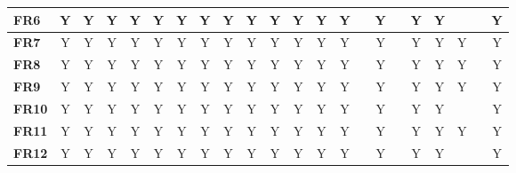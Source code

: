 \documentclass{article}
\begin{document}
\begin{table}[H]
\begin{adjustwidth}{-1.65in}{-1in}
{\begin{tabular}{c|c|c|c|c|c|c|c|c|c|c|c|c|c|c|c|c|c|c|c|c|c|}
\multicolumn{1}{|l|}{\textbf{FR6}}  & Y            & Y            & Y            & Y            & Y            & Y            & Y            & Y            & Y            & Y            & Y            & Y            & Y            &              & Y            &              & Y            & Y            &             &             & Y           \\ \hline
\multicolumn{1}{|l|}{\textbf{FR7}}  & Y            & Y            & Y            & Y            & Y            & Y            & Y            & Y            & Y            & Y            & Y            & Y            & Y            &              & Y            &              & Y            & Y            & Y           &             & Y           \\ \hline
\multicolumn{1}{|l|}{\textbf{FR8}}  & Y            & Y            & Y            & Y            & Y            & Y            & Y            & Y            & Y            & Y            & Y            & Y            & Y            &              & Y            &              & Y            & Y            & Y           &             & Y           \\ \hline
\multicolumn{1}{|l|}{\textbf{FR9}}  & Y            & Y            & Y            & Y            & Y            & Y            & Y            & Y            & Y            & Y            & Y            & Y            & Y            &              & Y            &              & Y            & Y            & Y           &             & Y           \\ \hline
\multicolumn{1}{|l|}{\textbf{FR10}} & Y            & Y            & Y            & Y            & Y            & Y            & Y            & Y            & Y            & Y            & Y            & Y            & Y            &              & Y            &              & Y            & Y            &             &             & Y           \\ \hline
\multicolumn{1}{|l|}{\textbf{FR11}} & Y            & Y            & Y            & Y            & Y            & Y            & Y            & Y            & Y            & Y            & Y            & Y            & Y            &              & Y            &              & Y            & Y            & Y           &             & Y           \\ \hline
\multicolumn{1}{|l|}{\textbf{FR12}} & Y            & Y            & Y            & Y            & Y            & Y            & Y            & Y            & Y            & Y            & Y            & Y            & Y            &              & Y            &              & Y            & Y            &             &             & Y           \\ \hline

\end{tabular}}
\end{adjustwidth}
\end{table}
\end{document}

